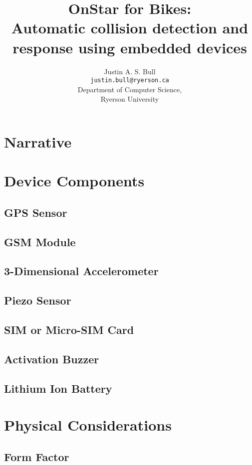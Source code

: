 \documentclass[titlepage]{article}
\title{OnStar for Bikes:\\
	Automatic collision detection and response using embedded devices}
\author{Justin A. S. Bull\\
	\texttt{justin.bull@ryerson.ca}\\
	Department of Computer Science,\\
	Ryerson University\\}
\begin{document}
\maketitle

\begin{abstract}
\lipsum
\end{abstract}

\tableofcontents

\section{Narrative}
\lipsum[1]

\section{Device Components}
\lipsum[1]
\subsection{GPS Sensor}
\lipsum[1]
\subsection{GSM Module}
\lipsum[1]
\subsection{3-Dimensional Accelerometer}
\lipsum[1]
\subsection{Piezo Sensor}
\lipsum[1]
\subsection{SIM or Micro-SIM Card}
\lipsum[1]
\subsection{Activation Buzzer}
\lipsum[1]
\subsection{Lithium Ion Battery}
\lipsum[1]

\section{Physical Considerations}
\lipsum[1]
\subsection{Form Factor}
\lipsum[1]
\end{document}
